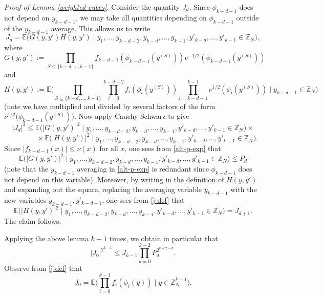 \documentclass[12pt,a4paper,reqno]{amsart}
\numberwithin{equation}{section}
\theoremstyle{plain}
\theoremstyle{definition}
\renewcommand{\leq}{\leqslant}
\def\vs{\vspace{11pt}}
\def\ni{\noindent}
\def\endproof{\hfill{\usebox{\proofbox}}}
\def\emph#1{{\it #1}}
\begin{document}
\noindent\textit{Proof of Lemma \ref{weighted-cubes}.} 
Consider the quantity $J_d$. Since $\phi_{k-d-1}$ does not depend on $y_{k-d-1}$, we may take all quantities depending on $\phi_{k-d-1}$ outside of the
$y_{k-d-1}$ average.  This allows us to write
\[ J_d = \mathbb{E}\big( G(y,y')H(y,y')\; \big|\; y_1,\dots,y_{k-d-2},y_{k-d},\dots,y_{k-1},y'_{k-d},\dots,y'_{k-1} \in \mathbb{Z}_N\big),\]
where
\[G(y,y') := \prod_{S \subseteq \{k-d,\dots,k-1\}}f_{k-d-1}(\phi_{k - d - 1}(y^{(S)})) \nu^{-1/2}(\phi_{k - d - 1}(y^{(S)})) \]
 and
\[
H(y,y') := \mathbb{E}\bigg(\prod_{S \subseteq \{k-d,\dots,k-1\}} \prod_{i=0}^{k-d-2} f_i(\phi_i(y^{(S)})) \prod_{i=k - d - 1}^{k-1} \nu^{1/2}(\phi_i (y^{(S)})) \; \bigg| \; y_{k - d - 1} \in \mathbb{Z}_N\bigg) \]
(note we have multiplied and divided by several factors of the form
$\nu^{1/2}(\phi_{k-d-1}(y^{(S)})$).  Now apply Cauchy-Schwarz to give
\[ |J_d|^2 \leq \mathbb{E} \big(|G(y,y')|^2 \; \big| \; y_1,\dots,y_{k-d-2},y_{k-d},\dots,y_{k-1},y'_{k-d},\dots,y'_{k-1} \in \mathbb{Z}_N\big) \times \] \[ \qquad \qquad\times\mathbb{E} \big(|H(y,y')|^2 \; \big| \; y_1,\dots,y_{k-d-2},y_{k-d},\dots,y_{k-1},y'_{k-d},\dots,y'_{k-1} \in \mathbb{Z}_N\big).\]
Since $|f_{k-d-1}(x)| \leq \nu(x)$ for all $x$, one sees from \eqref{alt-p-exp}
that
\[\mathbb{E} \big(|G(y,y')|^2 \; \big| \; y_1,\dots,y_{k-d-2},y_{k-d},\dots,y_{k-1},y'_{k-d},\dots,y'_{k-1} \in \mathbb{Z}_N\big) \leq P_{d}\]
(note that the $y_{k-d-1}$ averaging in \eqref{alt-p-exp} is redundant
since $\phi_{k-d-1}$ does not depend on this variable). 
Moreover, by writing in the definition of $H(y,y')$ and expanding out the square, replacing the averaging variable $y_{k - d - 1}$ with the new variables $y_{k - d - 1}, y'_{k - d - 1}$, one sees from \eqref{j-def} that
\[  \mathbb{E} \big(|H(y,y')|^2 \; \big| \; y_1,\dots,y_{k-d-2},y_{k-d},\dots,y_{k-1},y'_{k-d},\dots,y'_{k-1} \in \mathbb{Z}_N\big) = J_{d+1}.\]
The claim follows.
\endproof\vs

\ni Applying the above lemma $k-1$ times, we obtain in particular that
\begin{equation}\label{ind-hyp} |J_0|^{2^{k-1}} \leq J_{k-1} \prod_{d = 0}^{k-2} P_d^{2^{k-2-d}} .\end{equation}
Observe from \eqref{j-def} that
\begin{equation}\label{e-def} J_0 = \mathbb{E}\bigg( \prod_{i = 0}^{k-1} f_i(\phi_i(y)) \; \bigg| \;  y \in \mathbb{Z}_N^{k-1}\bigg).\end{equation}

\end{document}
